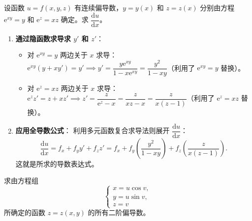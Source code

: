 \documentclass[lang=cn,11pt]{elegantbook}
\begin{document}

\begin{exercise}[隐函数组的全导数]
设函数 $u=f(x,y,z)$ 有连续偏导数，$y=y(x)$ 和 $z=z(x)$ 分别由方程 $\mathrm{e}^{xy}=y$ 和 $\mathrm{e}^z=xz$ 确定。求 $\dfrac{\mathrm{d}u}{\mathrm{d}x}$。
\end{exercise}

\begin{solution}
\begin{enumerate}
  \item \textbf{通过隐函数求导求 $y'$ 和 $z'$}：
  \begin{itemize}
    \item 对 $\mathrm{e}^{xy}=y$ 两边关于 $x$ 求导：$\mathrm{e}^{xy}(y + x y') = y' \implies y' = \dfrac{y\mathrm{e}^{xy}}{1-x\mathrm{e}^{xy}} = \dfrac{y^2}{1-xy}$（利用了 $\mathrm{e}^{xy}=y$ 替换）。
    \item 对 $\mathrm{e}^z=xz$ 两边关于 $x$ 求导：$\mathrm{e}^z z' = z + x z' \implies z' = \dfrac{z}{\mathrm{e}^z-x} = \dfrac{z}{xz-x} = \dfrac{z}{x(z-1)}$（利用了 $\mathrm{e}^z=xz$ 替换）。
  \end{itemize}
  
  \item \textbf{应用全导数公式}：
  利用多元函数复合求导法则展开 $\dfrac{\mathrm{d}u}{\mathrm{d}x}$：
  \[
  \frac{\mathrm{d}u}{\mathrm{d}x} = f_x + f_y y' + f_z z' = f_x + f_y \left( \frac{y^2}{1-xy} \right) + f_z \left( \frac{z}{x(z-1)} \right).
  \]
  这就是所求的导数表达式。
\end{enumerate}
\end{solution}



\begin{exercise}[柱坐标变换下的二阶偏导数]
求由方程组
\[
\begin{cases}
x=u\cos v,\\[4pt]
y=u\sin v,\\[4pt]
z=v
\end{cases}
\]
所确定的函数 $z=z(x,y)$ 的所有二阶偏导数。
\end{exercise}
\end{document}
